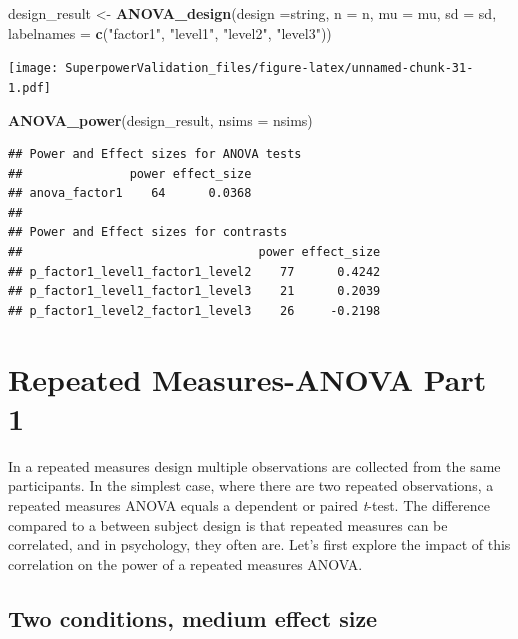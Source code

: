 \documentclass[]{book}
\newenvironment{Shaded}{\begin{snugshade}}{\end{snugshade}}
\newcommand{\DataTypeTok}[1]{\textcolor[rgb]{0.13,0.29,0.53}{#1}}
\newcommand{\KeywordTok}[1]{\textcolor[rgb]{0.13,0.29,0.53}{\textbf{#1}}}
\newcommand{\NormalTok}[1]{#1}
\newcommand{\StringTok}[1]{\textcolor[rgb]{0.31,0.60,0.02}{#1}}
\begin{document}
\begin{Shaded}
\begin{Highlighting}[]
\NormalTok{design_result <-}\StringTok{ }\KeywordTok{ANOVA_design}\NormalTok{(}\DataTypeTok{design =}\NormalTok{string,}
                   \DataTypeTok{n =}\NormalTok{ n, }
                   \DataTypeTok{mu =}\NormalTok{ mu, }
                   \DataTypeTok{sd =}\NormalTok{ sd, }
                   \DataTypeTok{labelnames =} \KeywordTok{c}\NormalTok{(}\StringTok{"factor1"}\NormalTok{, }\StringTok{"level1"}\NormalTok{, }\StringTok{"level2"}\NormalTok{, }\StringTok{"level3"}\NormalTok{))}
\end{Highlighting}
\end{Shaded}

\texttt{[image: SuperpowerValidation\_files/figure-latex/unnamed-chunk-31-1.pdf]}

\begin{Shaded}
\begin{Highlighting}[]
\KeywordTok{ANOVA_power}\NormalTok{(design_result, }\DataTypeTok{nsims =}\NormalTok{ nsims)}
\end{Highlighting}
\end{Shaded}

\begin{verbatim}
## Power and Effect sizes for ANOVA tests
##               power effect_size
## anova_factor1    64      0.0368
## 
## Power and Effect sizes for contrasts
##                                 power effect_size
## p_factor1_level1_factor1_level2    77      0.4242
## p_factor1_level1_factor1_level3    21      0.2039
## p_factor1_level2_factor1_level3    26     -0.2198
\end{verbatim}

\hypertarget{repeated-measures-anova-part-1}{%
\chapter{Repeated Measures-ANOVA Part 1}\label{repeated-measures-anova-part-1}}

In a repeated measures design multiple observations are collected from the same participants. In the simplest case, where there are two repeated observations, a repeated measures ANOVA equals a dependent or paired \emph{t}-test. The difference compared to a between subject design is that repeated measures can be correlated, and in psychology, they often are. Let's first explore the impact of this correlation on the power of a repeated measures ANOVA.

\hypertarget{two-conditions-medium-effect-size}{%
\section{Two conditions, medium effect size}\label{two-conditions-medium-effect-size}}
\end{document}
